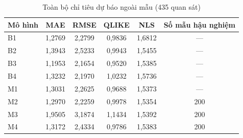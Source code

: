 \documentclass[11pt,a4paper]{article}
\begin{document}
\begin{table}[H]\centering\footnotesize
\caption{Toàn bộ chỉ tiêu dự báo ngoài mẫu (435 quan sát)}
\begin{tabularx}{\textwidth}{l C C C C C}
\toprule
\textbf{Mô hình} & \textbf{MAE} & \textbf{RMSE} & \textbf{QLIKE} & \textbf{NLS} & \textbf{Số mẫu hậu nghiệm} \\
\midrule
B1 & 1{,}2769 & 2{,}2799 & 0{,}9836 & 1{,}6812 & --- \\
B2 & 1{,}3943 & 2{,}5233 & 0{,}9943 & 1{,}5455 & --- \\
B3 & 1{,}1953 & 2{,}1654 & 0{,}9520 & 1{,}5385 & --- \\
B4 & 1{,}3232 & 2{,}1970 & 1{,}0232 & 1{,}5736 & --- \\
M1 & 1{,}3031 & 2{,}2625 & 0{,}9688 & 1{,}5373 & --- \\
M2 & 1{,}2970 & 2{,}2259 & 0{,}9978 & 1{,}5354 & 200 \\
M3 & 1{,}9505 & 3{,}1874 & 1{,}1434 & 1{,}5392 & 200 \\
M4 & 1{,}3172 & 2{,}4334 & 0{,}9786 & 1{,}5383 & 200 \\
\bottomrule
\end{tabularx}
\end{table}
\end{document}
